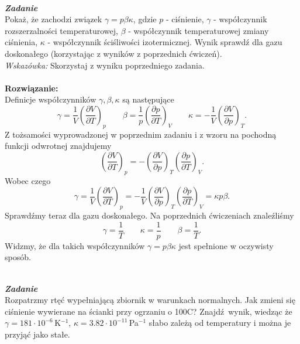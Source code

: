 \documentclass[11pt,a4paper]{article}
\newcounter{zadanie}\newcommand{\zadanie}[1][]{\addtocounter{zadanie}{1} ~\\  {\bf \emph{Zadanie \arabic{zadanie} #1 }} \\}
\newcommand{\Partial}[3]{\left( \frac{\partial #1}{\partial #2} \right)_{#3}}
\begin{document}
\newpage


\zadanie
Pokaż, że zachodzi związek $\gamma=p\beta\kappa$, gdzie $p$ - ciśnienie, 
$\gamma$ - współczynnik rozszerzalności temperaturowej,
$\beta$ - współczynnik temperaturowej zmiany ciśnienia, 
$\kappa$ - współczynnik ściśliwości izotermicznej. 
Wynik sprawdź dla gazu doskonałego (korzystając z wyników z poprzednich ćwiczeń).\\

{\it Wskazówka:} Skorzystaj z wyniku poprzedniego zadania.\\
\\
\textbf{Rozwiązanie:}
\\
Definicje współczynników $\gamma, \beta, \kappa$ są następujące
\begin{equation*}
    \gamma=\frac{1}{V} \Partial{V}{T}{p} \qquad \beta= \frac{1}{p} \Partial{p}{T}{V} \qquad \kappa =-\frac{1}{V} \Partial{V}{p}{T}.
\end{equation*}
Z tożsamości wyprowadzonej w poprzednim zadaniu i z wzoru na pochodną funkcji odwrotnej znajdujemy
\begin{equation*}
    \Partial{V}{T}{p}=-\Partial{V}{p}{T}\Partial{p}{T}{V}.
\end{equation*}
Wobec czego 
\begin{equation*}
    \gamma=\frac{1}{V} \Partial{V}{T}{p}=-\frac{1}{V}\Partial{V}{p}{T}\Partial{p}{T}{V}=\kappa p \beta.
\end{equation*}
Sprawdźmy teraz dla gazu doskonałego. Na poprzednich ćwiczeniach znaleźliśmy 
\begin{equation*}
    \gamma = \frac{1}{T} \qquad \kappa=\frac{1}{p} \qquad \beta =\frac{1}{T}.
\end{equation*}
Widzmy, że dla takich współczynników $\gamma =p \beta \kappa$ jest spełnione w oczywisty sposób.
\newpage

\zadanie
Rozpatrzmy rtęć wypełniającą zbiornik w warunkach normalnych. 
Jak zmieni się ciśnienie wywierane na ścianki przy ogrzaniu o 100\degree C?
Znajdź wynik, wiedząc że 
$\gamma=181\cdot 10^{-6}$\,K$^{-1}$, $\kappa= 3.82\cdot 10^{-11}$\,Pa$^{-1}$ słabo zależą od
temperatury i można je przyjąć jako stałe.\\
\end{document}
